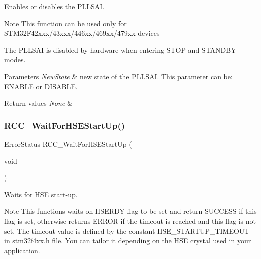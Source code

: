 Enables or disables the P\+L\+L\+S\+AI. 

\begin{DoxyNote}{Note}
This function can be used only for S\+T\+M32\+F42xxx/43xxx/446xx/469xx/479xx devices

The P\+L\+L\+S\+AI is disabled by hardware when entering S\+T\+OP and S\+T\+A\+N\+D\+BY modes. ~\newline

\end{DoxyNote}

\begin{DoxyParams}{Parameters}
{\em New\+State} & new state of the P\+L\+L\+S\+AI. This parameter can be\+: E\+N\+A\+B\+LE or D\+I\+S\+A\+B\+LE. \\
\hline
\end{DoxyParams}

\begin{DoxyRetVals}{Return values}
{\em None} & \\
\hline
\end{DoxyRetVals}
\mbox{\label{group___r_c_c___group1_gae0f15692614dd048ee4110a056f001dc}} 
\subsubsection{\texorpdfstring{R\+C\+C\+\_\+\+Wait\+For\+H\+S\+E\+Start\+Up()}{RCC\_WaitForHSEStartUp()}}
{\footnotesize\ttfamily Error\+Status R\+C\+C\+\_\+\+Wait\+For\+H\+S\+E\+Start\+Up (\begin{DoxyParamCaption}\item[{void}]{ }\end{DoxyParamCaption})}



Waits for H\+SE start-\/up. 

\begin{DoxyNote}{Note}
This functions waits on H\+S\+E\+R\+DY flag to be set and return S\+U\+C\+C\+E\+SS if this flag is set, otherwise returns E\+R\+R\+OR if the timeout is reached and this flag is not set. The timeout value is defined by the constant H\+S\+E\+\_\+\+S\+T\+A\+R\+T\+U\+P\+\_\+\+T\+I\+M\+E\+O\+UT in stm32f4xx.\+h file. You can tailor it depending on the H\+SE crystal used in your application. 
\end{DoxyNote}

